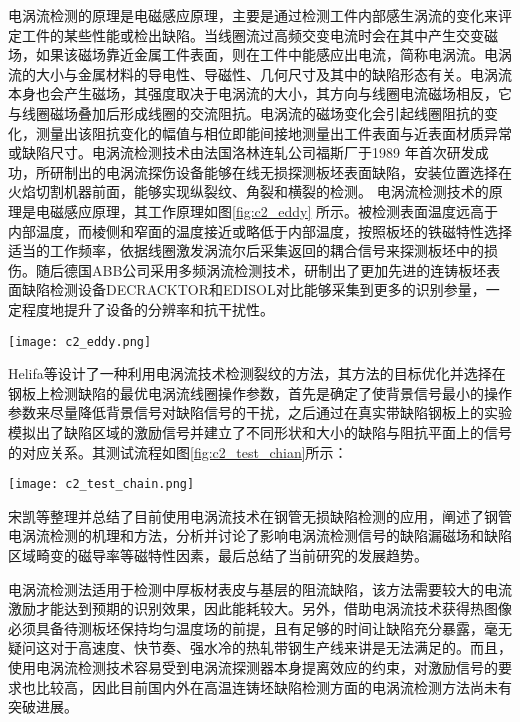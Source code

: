     电涡流检测的原理是电磁感应原理，主要是通过检测工件内部感生涡流的变化来评定工件的某些性能或检出缺陷。当线圈流过高频交变电流时会在其中产生交变磁场，如果该磁场靠近金属工件表面，则在工件中能感应出电流，简称电涡流。电涡流的大小与金属材料的导电性、导磁性、几何尺寸及其中的缺陷形态有关。电涡流本身也会产生磁场，其强度取决于电涡流的大小，其方向与线圈电流磁场相反，它与线圈磁场叠加后形成线圈的交流阻抗。电涡流的磁场变化会引起线圈阻抗的变化，测量出该阻抗变化的幅值与相位即能间接地测量出工件表面与近表面材质异常或缺陷尺寸。电涡流检测技术由法国洛林连轧公司福斯厂于1989 年首次研发成功，所研制出的电涡流探伤设备能够在线无损探测板坯表面缺陷，安装位置选择在火焰切割机器前面，能够实现纵裂纹、角裂和横裂的检测\cite{让路1995用安装在火焰切割设备前的涡流探测器检验热连铸板坯的表面质量}。 电涡流检测技术的原理是电磁感应原理，其工作原理如图\ref{fig:c2_eddy} 所示。被检测表面温度远高于内部温度，而棱侧和窄面的温度接近或略低于内部温度，按照板坯的铁磁特性选择适当的工作频率，依据线圈激发涡流尔后采集返回的耦合信号来探测板坯中的损伤。随后德国ABB公司采用多频涡流检测技术，研制出了更加先进的连铸板坯表面缺陷检测设备DECRACKTOR和EDISOL对比能够采集到更多的识别参量，一定程度地提升了设备的分辨率和抗干扰性。

    \begin{figure*}[!h]
    \centering
    \texttt{[image: c2\_eddy.png]}
    \caption{电涡流检测原理}
    \label{fig:c2_eddy}
    \end{figure*}

    Helifa等\cite{Helifa2006Detection}设计了一种利用电涡流技术检测裂纹的方法，其方法的目标优化并选择在钢板上检测缺陷的最优电涡流线圈操作参数，首先是确定了使背景信号最小的操作参数来尽量降低背景信号对缺陷信号的干扰，之后通过在真实带缺陷钢板上的实验模拟出了缺陷区域的激励信号并建立了不同形状和大小的缺陷与阻抗平面上的信号的对应关系。其测试流程如图\ref{fig:c2_test_chian}所示：

    \begin{figure*}[!h]
    \centering
    \texttt{[image: c2\_test\_chain.png]}
    \caption{电涡流探伤检测流程}
    \label{fig:c2_test_chian}
    \end{figure*}

    宋凯等\cite{宋凯2015钢管磁特性对涡流检测影响的研究进展}整理并总结了目前使用电涡流技术在钢管无损缺陷检测的应用，阐述了钢管电涡流检测的机理和方法，分析并讨论了影响电涡流检测信号的缺陷漏磁场和缺陷区域畸变的磁导率等磁特性因素，最后总结了当前研究的发展趋势。

    电涡流检测法适用于检测中厚板材表皮与基层的阻流缺陷，该方法需要较大的电流激励才能达到预期的识别效果，因此能耗较大。另外，借助电涡流技术获得热图像必须具备待测板坯保持均匀温度场的前提，且有足够的时间让缺陷充分暴露，毫无疑问这对于高速度、快节奏、强水冷的热轧带钢生产线来讲是无法满足的。而且，使用电涡流检测技术容易受到电涡流探测器本身提离效应的约束，对激励信号的要求也比较高，因此目前国内外在高温连铸坯缺陷检测方面的电涡流检测方法尚未有突破进展。

